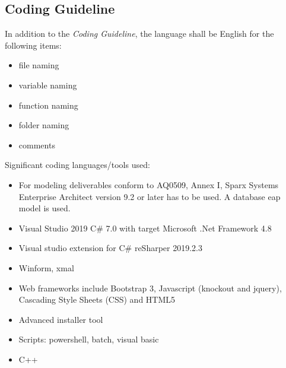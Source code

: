\subsection{Coding Guideline}
In addition to the \textit{Coding Guideline}, the language shall be English for
the following items:
\begin{itemize}
    \item file naming
    \item variable naming
    \item function naming
    \item folder naming
    \item comments
\end{itemize}

Significant coding languages/tools used:
\begin{itemize}
    \item For modeling deliverables conform to AQ0509, Annex I, Sparx Systems
      Enterprise Architect version 9.2 or later has to be used. A database eap
      model is used.  
    \item Visual Studio 2019 C\# 7.0 with target Microsoft .Net Framework 4.8 
    \item Visual studio extension for C\# reSharper 2019.2.3
    \item Winform, xmal
    \item Web frameworks include Bootstrap 3, Javascript (knockout and jquery),
      Cascading Style Sheets (CSS) and HTML5
    \item Advanced installer tool
    \item Scripts: powershell, batch, visual basic
    \item C++
\end{itemize}
